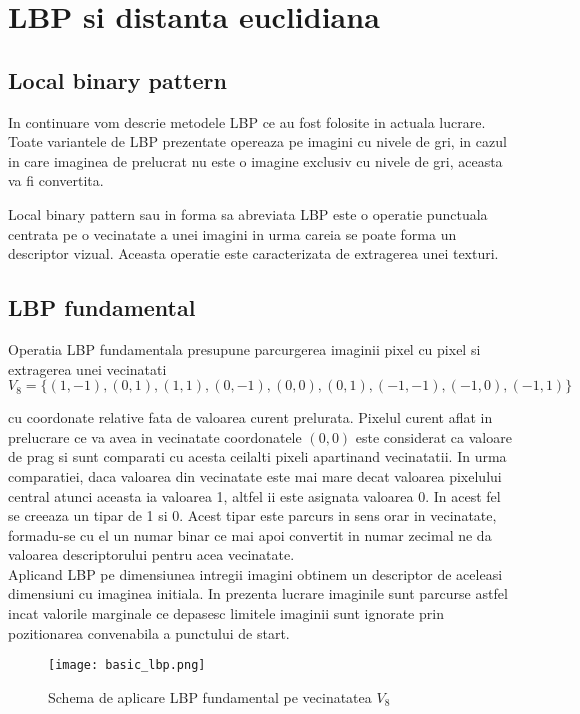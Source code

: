 \section{LBP si distanta euclidiana}

\subsection{Local binary pattern}

\quad In continuare vom descrie metodele LBP ce au fost folosite in
actuala lucrare. Toate variantele de LBP prezentate opereaza pe imagini 
cu nivele de gri, in cazul in care imaginea de prelucrat nu este o imagine
exclusiv cu nivele de gri, aceasta va fi convertita.

\quad Local binary pattern sau in forma sa abreviata LBP este o operatie punctuala centrata  
pe o vecinatate a unei imagini in urma careia se poate forma un descriptor vizual. Aceasta 
operatie este caracterizata de extragerea unei texturi.


\subsection{LBP fundamental}

\quad Operatia LBP fundamentala presupune parcurgerea imaginii pixel cu pixel si extragerea 
unei vecinatati 
\[
V_8 = \{ (1,-1), (0,1), (1,1), (0,-1), (0,0), (0,1),(-1,-1), (-1,0), (-1,1) \}	
\]

cu coordonate relative fata de valoarea curent prelurata. Pixelul curent aflat in prelucrare ce va avea in vecinatate coordonatele 
$(0,0)$ este considerat ca valoare de prag si sunt comparati cu acesta
ceilalti pixeli apartinand vecinatatii. In urma comparatiei, daca valoarea din vecinatate este mai mare decat valoarea pixelului central 
atunci aceasta ia valoarea 1, altfel ii este asignata valoarea 0. In
acest fel se creeaza un tipar de 1 si 0. Acest tipar este parcurs in sens orar in vecinatate, formadu-se cu el un numar binar ce mai apoi convertit in numar zecimal ne da valoarea descriptorului pentru acea 
vecinatate. \\
\null \quad Aplicand LBP pe dimensiunea intregii imagini obtinem un descriptor
de aceleasi dimensiuni cu imaginea initiala. In prezenta lucrare 
imaginile sunt parcurse astfel incat valorile marginale ce depasesc
limitele imaginii sunt ignorate prin pozitionarea convenabila a 
punctului de start. \\

\begin{figure}[H]
	\texttt{[image: basic\_lbp.png]}
	\centering
	\caption{Schema de aplicare LBP fundamental pe vecinatatea $V_8$}
\end{figure}


